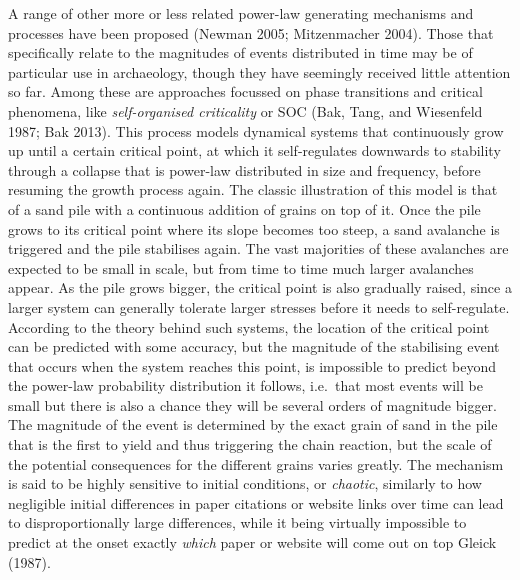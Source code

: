 \documentclass[
  12pt,
  a4paper, twoside]{book}
\begin{document}
A range of other more or less related power-law generating mechanisms and processes have been proposed (Newman 2005; Mitzenmacher 2004). Those that specifically relate to the magnitudes of events distributed in time may be of particular use in archaeology, though they have seemingly received little attention so far. Among these are approaches focussed on phase transitions and critical phenomena, like \emph{self-organised criticality} or SOC (Bak, Tang, and Wiesenfeld 1987; Bak 2013). This process models dynamical systems that continuously grow up until a certain critical point, at which it self-regulates downwards to stability through a collapse that is power-law distributed in size and frequency, before resuming the growth process again. The classic illustration of this model is that of a sand pile with a continuous addition of grains on top of it. Once the pile grows to its critical point where its slope becomes too steep, a sand avalanche is triggered and the pile stabilises again. The vast majorities of these avalanches are expected to be small in scale, but from time to time much larger avalanches appear. As the pile grows bigger, the critical point is also gradually raised, since a larger system can generally tolerate larger stresses before it needs to self-regulate. According to the theory behind such systems, the location of the critical point can be predicted with some accuracy, but the magnitude of the stabilising event that occurs when the system reaches this point, is impossible to predict beyond the power-law probability distribution it follows, i.e.~that most events will be small but there is also a chance they will be several orders of magnitude bigger. The magnitude of the event is determined by the exact grain of sand in the pile that is the first to yield and thus triggering the chain reaction, but the scale of the potential consequences for the different grains varies greatly. The mechanism is said to be highly sensitive to initial conditions, or \emph{chaotic}, similarly to how negligible initial differences in paper citations or website links over time can lead to disproportionally large differences, while it being virtually impossible to predict at the onset exactly \emph{which} paper or website will come out on top Gleick (1987).
\end{document}
